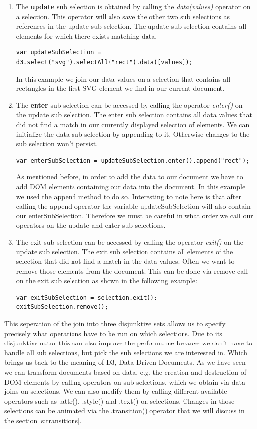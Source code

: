 \documentclass{bioinfo}
\begin{document}
\begin{enumerate}
\item The \textbf{update} sub selection is obtained by calling the \textit{data(values)} operator on a selection. This operator will also save the other two sub selections as references in the update sub selection.
The update sub selection contains all elements for which there exists matching data.
\begin{lstlisting}
var updateSubSelection = d3.select("svg").selectAll("rect").data([values]);
\end{lstlisting}
In this example we join our data values on a selection that contains all rectangles in the first SVG element we find in our current document.

\item The \textbf{enter} sub selection can be accessed by calling the operator \textit{enter()} on the update sub selection.
The enter sub selection contains all data values that did not find a match in our currently displayed selection of elements. We can initialize the data sub selection by appending to it. Otherwise changes to the sub selection won't persist.
\begin{lstlisting}
var enterSubSelection = updateSubSelection.enter().append("rect");
\end{lstlisting}
As mentioned before, in order to add the data to our document we have to add DOM elements containing our data into the document. In this example we used the append method to do so.
Interesting to note here is that after calling the append operator the variable updateSubSelection will also contain our enterSubSelection.
Therefore we must be careful in what order we call our operators on the update and enter sub selections.

\item The exit sub selection can be accessed by calling the operator \textit{exit()} on the update sub selection.
The exit sub selection contains all elements of the selection that did not find a match in the data values.
Often we want to remove those elements from the document. This can be done via remove call on the exit sub selection as shown in the following example:
\begin{lstlisting}
var exitSubSelection = selection.exit();
exitSubSelection.remove();
\end{lstlisting}
\end{enumerate}

This seperation of the join into three disjunktive sets allows us to specify precisely what operations have to be run on which selections. Due to its disjunktive natur this can also improve the performance because we don't have to handle all sub selections, but pick the sub selections we are interested in.
Which brings us back to the meaning of D3, Data Driven Documents.
As we have seen we can transform documents based on data, e.g. the creation and destruction of DOM elements by calling operators on sub selections, which we obtain via data joins on selections.
We can also modify them by calling different available operators such as .attr(), .style() and .text() on selections.
Changes in those selections can be animated via the .transition() operator that we will discuss in the section \ref{s:transitions}.
\end{document}
